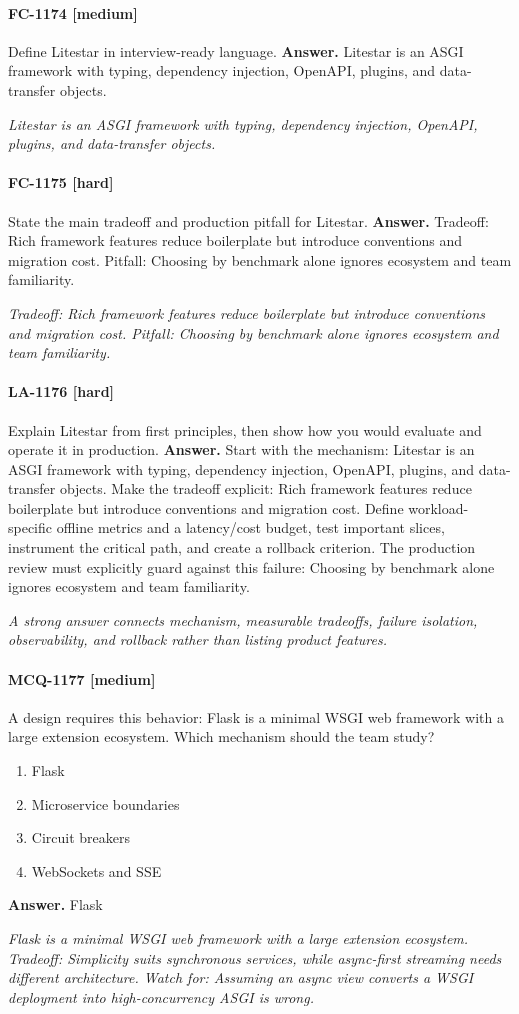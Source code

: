 \paragraph{FC-1174 [medium]} Define Litestar in interview-ready language.
\noindent\textbf{Answer.} Litestar is an ASGI framework with typing, dependency injection, OpenAPI, plugins, and data-transfer objects.
\par\textit{Litestar is an ASGI framework with typing, dependency injection, OpenAPI, plugins, and data-transfer objects.}
\paragraph{FC-1175 [hard]} State the main tradeoff and production pitfall for Litestar.
\noindent\textbf{Answer.} Tradeoff: Rich framework features reduce boilerplate but introduce conventions and migration cost. Pitfall: Choosing by benchmark alone ignores ecosystem and team familiarity.
\par\textit{Tradeoff: Rich framework features reduce boilerplate but introduce conventions and migration cost. Pitfall: Choosing by benchmark alone ignores ecosystem and team familiarity.}
\paragraph{LA-1176 [hard]} Explain Litestar from first principles, then show how you would evaluate and operate it in production.
\noindent\textbf{Answer.} Start with the mechanism: Litestar is an ASGI framework with typing, dependency injection, OpenAPI, plugins, and data-transfer objects. Make the tradeoff explicit: Rich framework features reduce boilerplate but introduce conventions and migration cost. Define workload-specific offline metrics and a latency/cost budget, test important slices, instrument the critical path, and create a rollback criterion. The production review must explicitly guard against this failure: Choosing by benchmark alone ignores ecosystem and team familiarity.
\par\textit{A strong answer connects mechanism, measurable tradeoffs, failure isolation, observability, and rollback rather than listing product features.}
\paragraph{MCQ-1177 [medium]} A design requires this behavior: Flask is a minimal WSGI web framework with a large extension ecosystem. Which mechanism should the team study?
\begin{enumerate}[label=\Alph*.]
\item Flask
\item Microservice boundaries
\item Circuit breakers
\item WebSockets and SSE
\end{enumerate}
\noindent\textbf{Answer.} Flask
\par\textit{Flask is a minimal WSGI web framework with a large extension ecosystem. Tradeoff: Simplicity suits synchronous services, while async-first streaming needs different architecture. Watch for: Assuming an async view converts a WSGI deployment into high-concurrency ASGI is wrong.}
